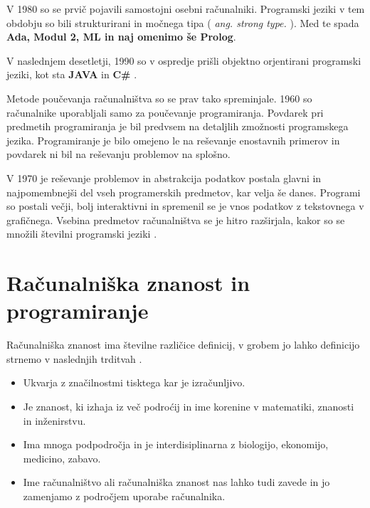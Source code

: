V 1980 so se prvič pojavili samostojni osebni računalniki. Programski
jeziki v tem obdobju so bili strukturirani in močnega tipa (
\emph{ang.  strong type.} ). Med te spada \textbf{Ada, Modul 2, ML in
  naj omenimo še Prolog}.

V naslednjem desetletji, 1990 so v ospredje
prišli objektno orjentirani programski jeziki, kot sta \textbf{JAVA}
in \textbf{C\#} \cite{thesisAWebP}.



Metode poučevanja računalništva so se prav tako spreminjale. 1960 so
računalnike uporabljali samo za poučevanje programiranja. Povdarek pri
predmetih programiranja je bil predvsem na detaljlih zmožnosti
programskega jezika. Programiranje je bilo omejeno le na reševanje
enostavnih primerov in povdarek ni bil na reševanju problemov na
splošno.

V 1970 je reševanje problemov in abstrakcija podatkov postala glavni
in najpomembnejši del vseh programerskih predmetov, kar velja še
danes.  Programi so postali večji, bolj interaktivni in spremenil se
je vnos podatkov z tekstovnega v grafičnega. Vsebina predmetov
računalništva se je hitro razširjala, kakor so se množili številni
programski jeziki \cite{thesisAWebP}.



\section{Računalniška znanost in programiranje}
\label{sec:računalniška_znanost_in_programiranje}

Računalniška znanost ima številne različice definicij, v grobem jo
lahko definicijo strnemo v naslednjih trditvah \cite{guideTCS}.

\begin{itemize}
\tightlist
\item Ukvarja z značilnostmi tisktega kar je izračunljivo.
\item Je znanost, ki izhaja iz več podroćij in ime korenine v matematiki,
znanosti in inženirstvu.
\item Ima mnoga podpodročja in je interdisiplinarna z biologijo,
ekonomijo, medicino, zabavo.
\item Ime računalništvo ali računalniška znanost nas lahko tudi zavede in
jo zamenjamo z področjem uporabe računalnika.
\end{itemize}

